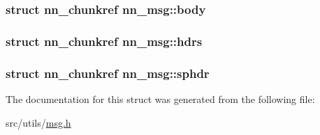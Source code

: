 \subsubsection[{body}]{\setlength{\rightskip}{0pt plus 5cm}struct {\bf nn\+\_\+chunkref} nn\+\_\+msg\+::body}\hypertarget{structnn__msg_ac52dbfdec4cf8d5a0b93d91a4375fd9f}{}\label{structnn__msg_ac52dbfdec4cf8d5a0b93d91a4375fd9f}
\subsubsection[{hdrs}]{\setlength{\rightskip}{0pt plus 5cm}struct {\bf nn\+\_\+chunkref} nn\+\_\+msg\+::hdrs}\hypertarget{structnn__msg_a79cb5562faf3e56ba7922ff9beec621d}{}\label{structnn__msg_a79cb5562faf3e56ba7922ff9beec621d}
\subsubsection[{sphdr}]{\setlength{\rightskip}{0pt plus 5cm}struct {\bf nn\+\_\+chunkref} nn\+\_\+msg\+::sphdr}\hypertarget{structnn__msg_abcd1120a337ed2957e733a0f829a2563}{}\label{structnn__msg_abcd1120a337ed2957e733a0f829a2563}


The documentation for this struct was generated from the following file\+:\begin{DoxyCompactItemize}
\item 
src/utils/\hyperlink{msg_8h}{msg.\+h}\end{DoxyCompactItemize}
